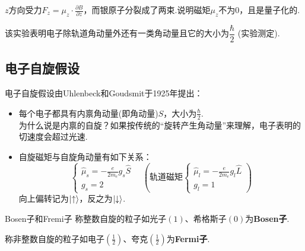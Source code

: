 \begin{center}
\begin{minipage}{0.36\textwidth}
        $z$方向受力$F_z=\mu_z \cdot \frac{\partial B}{\partial z}$，而银原子分裂成了两束.说明磁矩$\mu_z$不为$0$，且是量子化的.
    \end{minipage}
\end{center}
该实验表明电子除轨道角动量外还有一类角动量且它的大小为$\dfrac{\hbar}{2}$ (实验测定).

\subsection{电子自旋假设}
电子自旋假设由Uhlenbeck和Goudsmit于1925年提出：
\begin{itemize}
    \item 每个电子都具有内禀角动量(即角动量)$\hat{S}$，大小为$\frac{\hbar}{2}$. \\
    为什么说是内禀的自旋？如果按传统的“旋转产生角动量”来理解，电子表明的切速度会超过光速.
    \item 自旋磁矩与自旋角动量有如下关系：
    \[
    \begin{cases}
        \hat{\mu}_s = -\frac{e}{2m_e}g_s \hat{S} \\
        g_s = 2
    \end{cases}
    \quad
    \left(
        \text{轨道磁矩}\begin{cases}
            \hat{\mu}_l = -\frac{e}{2m_e} g_l \hat{L} \\
            g_l = 1
        \end{cases}
    \right)
    \]
    向上偏转记为$\ket{\uparrow }$，反之为$\ket{\downarrow}$.
\end{itemize}
\begin{extension}{Bosen子和Fremi子}
    称整数自旋的粒子如光子$(1)$、希格斯子$(0)$为\textbf{Bosen子}.

    称非整数自旋的粒子如电子$(\frac{1}{2})$、夸克$(\frac{1}{2})$为\textbf{Fermi子}.
\end{extension}

